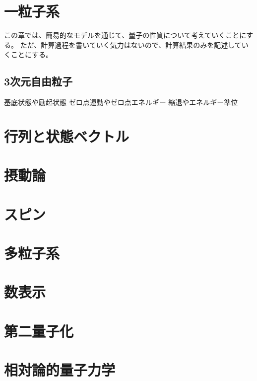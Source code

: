 \documentclass[a4paper]{jsreport}
\begin{document}
    \chapter{一粒子系}
        この章では、簡易的なモデルを通じて、量子の性質について考えていくことにする。
        ただ、計算過程を書いていく気力はないので、計算結果のみを記述していくことにする。
        \section{3次元自由粒子}
            基底状態や励起状態
            ゼロ点運動やゼロ点エネルギー
            縮退やエネルギー準位


    \chapter{行列と状態ベクトル}
    \chapter{摂動論}
    \chapter{スピン}
    \chapter{多粒子系}
    \chapter{数表示}
    \chapter{第二量子化}
    \chapter{相対論的量子力学}
        
\end{document}
